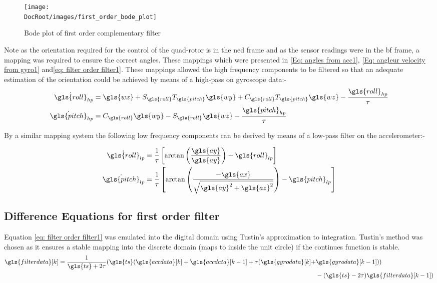 \begin{figure}[h]
	\centering
	\texttt{[image: \\DocRoot/images/first\_order\_bode\_plot]}
	\caption{Bode plot of first order complementary filter}
	\label{Fig:bode first order com}
\end{figure}


Note as the orientation required for the control of the quad-rotor is in the \gls{ned} frame and as the sensor readings were in the \gls{bf} frame, a mapping was required to ensure the correct angles. These mappings which were presented in \eqref{Eq: angles from acc1}, \eqref{Eq: angleur velocity from gyro1} and\eqref{eq: filter order filter1}. These mappings allowed 
the high frequency components to be filtered so that an adequate estimation of the orientation could be achieved by means of a high-pass on gyroscope data:-
\begin{align}
	\dot{\gls{roll}}_{hp}  & =   \gls{wx} + S_{\gls{roll}}T_{\gls{pitch}}\gls{wy} + C_{\gls{roll}}T_{\gls{pitch}}\gls{wz}   - \frac{\gls{roll}_{hp}}{\tau} \\
	\dot{\gls{pitch}}_{hp} & =  C_{\gls{roll}}\gls{wy} - S_{\gls{roll}}\gls{wz} - \frac{\gls{pitch}_{hp}}{\tau}
\end{align}

By a similar mapping system the following low frequency components can be derived by means of a low-pass filter on the accelerometer:-

\begin{align}
	\dot{\gls{roll}}_{lp}  & =   \frac{1}{\tau}\left[\arctan\left(\frac{\gls{ay}}{\gls{ay}}\right) - \gls{roll}_{lp}\right]                      \\
	\dot{\gls{pitch}}_{lp} & =  \frac{1}{\tau}\left[\arctan\left(\frac{-\gls{ax}}{\sqrt{\gls{ay}^2+\gls{az}^2}}\right) - \gls{pitch}_{lp}\right]
\end{align}

\subsection{Difference Equations for first order filter}
Equation \ref{eq: filter order filter1} was emulated into the digital domain using Tustin's approximation to integration. Tustin's method was chosen as it ensures a stable mapping into the discrete domain (maps to inside the unit circle) if the continues function is stable.
\begin{equation}
	\begin{split}
		\gls{filterdata} [k] = \frac{1}{\gls{ts} + 2\tau}(\gls{ts} ( \gls{accdata} [k] + \gls{accdata} [k-1]  +  \tau(\gls{gyrodata} [k] + &\gls{gyrodata} [k-1])) \\ &-(\gls{ts} -2\tau)\gls{filterdata} [k-1] ) \label{eq: diff equation for the first order comp filter}
	\end{split}
\end{equation}


